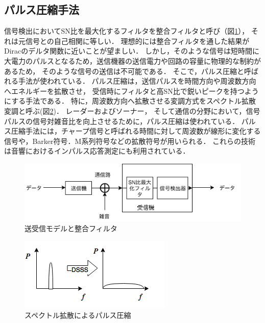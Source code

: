 \subsection{パルス圧縮手法}

信号検出においてSN比を最大化するフィルタを整合フィルタと呼び（図\ref{fig:matched_filter}），
それは元信号との自己相関に等しい\cite{seigoufilter}．
理想的には整合フィルタを通した結果がDiracのデルタ関数に近いことが望ましい．
しかし，そのような信号は短時間に大電力のパルスとなるため，送信機器の送信電力や回路の容量に物理的な制約があるため，
そのような信号の送信は不可能である．
そこで，パルス圧縮と呼ばれる手法が使われている\cite{pulsecompress}．
パルス圧縮は，送信パルスを時間方向や周波数方向へエネルギーを拡散させ，
受信時にフィルタと高SN比で鋭いピークを持つようにする手法である．
特に，周波数方向へ拡散させる変調方式をスペクトル拡散変調と呼ぶ(図\ref{fig:DS})．
レーダー\cite{レーダ技術, レーダ信号処理技術, 稲葉敬之11}およびソーナー\cite{山口功, acoima, 海洋音響の基礎と応用, 水中音響学}，
そして通信\cite{高野忠00, 高野忠01}の分野において，信号パルスの信号対雑音比を向上させるために，パルス圧縮は使われている\cite{電子戦の技術基礎編, 電子戦の技術拡充編, 電子戦の技術通信電子戦編}．
パルス圧縮手法には，チャープ信号と呼ばれる時間に対して周波数が線形に変化する信号や，Barker符号．M系列符号などの拡散符号が用いられる\cite{谷本正幸, specto, yamauchi, Dixon}．
これらの技術は音響におけるインパルス応答測定にも利用されている\cite{渋澤功, 金田豊, 守谷直也, nonlinear}．

\begin{figure}[p]\centering
\includegraphics[clip,width=1.05\hsize]{img/matched_filter.png}
\caption{送受信モデルと整合フィルタ}\label{fig:matched_filter}
\end{figure}


\begin{figure}[p]\centering
\includegraphics[clip,width=1.05\hsize]{img/DS.png}
\caption{スペクトル拡散によるパルス圧縮}\label{fig:DS}
\end{figure}


